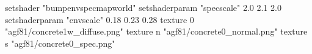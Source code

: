 setshader "bumpenvspecmapworld"
setshaderparam "specscale" 2.0 2.1 2.0
setshaderparam "envscale"  0.18 0.23 0.28
   texture 0 "agf81/concrete1w_diffuse.png"
   texture n "agf81/concrete0_normal.png"
   texture s "agf81/concrete0_spec.png"